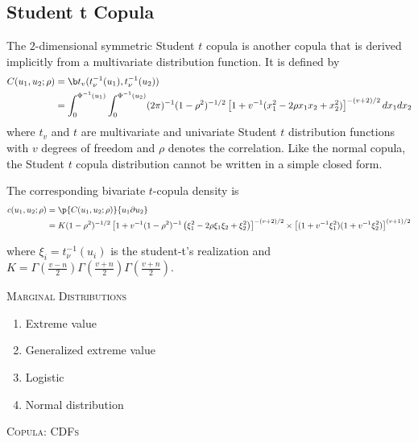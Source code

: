 \subsection{Student t Copula}

The $2$-dimensional symmetric Student $t$ copula is another copula that is derived implicitly from a multivariate distribution function. It is defined by
\begin{align*}
C(u_1, u_2; \rho) &= \b t_v(t_{\nu}^{-1}(u_1), t_{\nu}^{-1}(u_2))
\\
&= \int_0^{\Phi^{-1}(u_1)} \int_0^{\Phi^{-1}(u_2)} (2\pi)^{-1} (1 - \rho^2)^{-1/2} \left[1 + v^{-1}(x_1^2 - 2\rho x_1 x_2 + x_2^2)\right]^{-(v+2)/2} dx_1 dx_2
\end{align*}
where $t_v$ and $t$ are multivariate and univariate Student $t$ distribution functions with $v$ degrees of freedom and $\rho$ denotes the correlation. Like the normal copula, the Student $t$ copula distribution cannot be written in a simple closed form.

The corresponding bivariate $t$-copula density is
\begin{align*}
c(u_1, u_2; \rho) 
&= \p{C(u_1,u_2;\rho)}{u_1 \partial u_2}
\\
&= K(1 - \rho^2)^{-1/2} \left[1 + v^{-1}(1 - \rho^2)^{-1} \left(\xi_1^2 -2\rho\xi_1 \xi_2+ \xi_2^2\right)\right]^{-(v+2)/2} \times
\left[(1 + v^{-1} \xi_1^2)(1 + v^{-1} \xi_2^2)\right]^{(v+1)/2}
\end{align*}

where 
$\xi_i=t_{\nu}^{-1}(u_i)$ is the student-t's realization
and
$
K = \Gamma\left(\frac{v - n}{2}\right) \Gamma\left(\frac{v + n}{2}\right) \Gamma\left(\frac{v + n}{2}\right).
$


\Vhrulefill

\textsc{Marginal Distributions}
\begin{enumerate}
\item Extreme value
\item Generalized extreme value
\item Logistic
\item Normal distribution
\end{enumerate}

\Vhrulefill


\textsc{Copula: CDFs}

